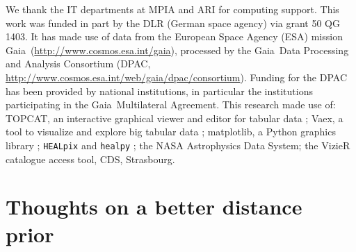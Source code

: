 \documentclass[twocolumn]{aastex62}
\providecommand{\gaia}{Gaia}
\begin{document}
\acknowledgments
We thank the IT departments at MPIA and ARI for computing support.
This work was funded in part by the DLR (German space agency) via grant 50 QG 1403.
It has made use of data from the European Space Agency (ESA) mission \gaia\ (\url{http://www.cosmos.esa.int/gaia}), processed by the \gaia\ Data Processing and Analysis Consortium (DPAC, \url{http://www.cosmos.esa.int/web/gaia/dpac/consortium}). Funding for the DPAC has been provided by national institutions, in particular the institutions participating in the \gaia\ Multilateral Agreement. 
This research made use of: TOPCAT, an interactive graphical viewer and editor for tabular data \citep{2005ASPC..347...29T}; Vaex, a tool to visualize and explore big tabular data \citep{2018A&A...618A..13B}; matplotlib, a Python graphics library \citep{Hunter:2007}; \texttt{HEALpix} \citep{2005ApJ...622..759G} and \texttt{healpy} \citep{2019JOSS....4.1298Z}; the NASA Astrophysics Data System; the VizieR catalogue access tool, CDS, Strasbourg.




\appendix

\section{Thoughts on a better distance prior}\label{sec:thoughts_prior}
\end{document}
